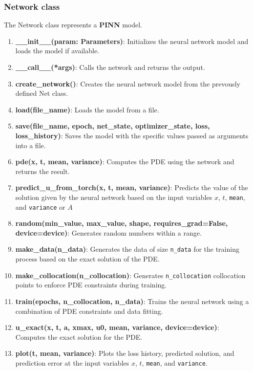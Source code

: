 \documentclass{article}
\begin{document}
\subsubsection{Network class} The Network class represents a \textbf{PINN} model.
\begin{enumerate}
    \item \textbf{\_\_init\_\_(param: Parameters)}: Initializes the neural network model and loads the model if available.

    \item \textbf{\_\_call\_\_(*args)}: Calls the network and returns the output.
    
    \item \textbf{create\_network()}: Creates the neural network model from the prevously defined Net class.
    
    \item \textbf{load(file\_name)}: Loads the model from a file. 
    
    \item \textbf{save(file\_name, epoch, net\_state, optimizer\_state, loss, loss\_history)}: Saves the model with the specific values passed as arguments into a file.
    
    \item \textbf{pde(x, t, mean, variance)}: Computes the PDE using the network and returns the result.
    
    \item \textbf{predict\_u\_from\_torch(x, t, mean, variance)}: Predicts the value of the solution given by the neural network based on the input variables $x$, $t$, \texttt{mean}, and \texttt{variance} or $A$
    
    \item \textbf{random(min\_value, max\_value, shape, requires\_grad=False, device=device)}: Generates random numbers within a range.
    
    \item \textbf{make\_data(n\_data)}: Generates the data of size \texttt{n\_data} for the training process based on the exact solution of the PDE.
    
    \item \textbf{make\_collocation(n\_collocation)}: Generates \texttt{n\_collocation} collocation points to enforce PDE constraints during training.
    
    \item \textbf{train(epochs, n\_collocation, n\_data)}: Trains the neural network using a combination of PDE constraints and data fitting.
    
    \item \textbf{u\_exact(x, t, a, xmax, u0, mean, variance, device=device)}: Computes the exact solution for the PDE.
    
    \item \textbf{plot(t, mean, variance)}: Plots the loss history, predicted solution, and prediction error at the input variables $x$, $t$, \texttt{mean}, and \texttt{variance}.

\end{enumerate}
\end{document}
